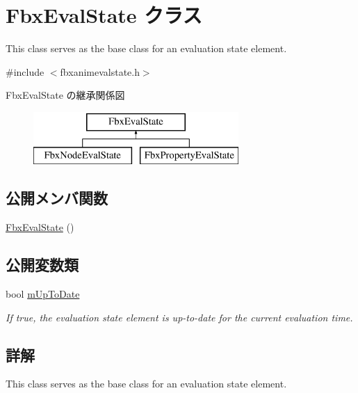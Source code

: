 \hypertarget{class_fbx_eval_state}{}\section{Fbx\+Eval\+State クラス}
\label{class_fbx_eval_state}


This class serves as the base class for an evaluation state element.  




{\ttfamily \#include $<$fbxanimevalstate.\+h$>$}

Fbx\+Eval\+State の継承関係図\begin{figure}[H]
\begin{center}
\leavevmode
\includegraphics[height=2.000000cm]{class_fbx_eval_state}
\end{center}
\end{figure}
\subsection*{公開メンバ関数}
\begin{DoxyCompactItemize}
\item 
\hyperlink{class_fbx_eval_state_a9c54619a6fa810228fbb017965492507}{Fbx\+Eval\+State} ()
\end{DoxyCompactItemize}
\subsection*{公開変数類}
\begin{DoxyCompactItemize}
\item 
bool \hyperlink{class_fbx_eval_state_a9c153054cba876e54d38046e582b32d0}{m\+Up\+To\+Date}
\begin{DoxyCompactList}\small\item\em If {\ttfamily true}, the evaluation state element is up-\/to-\/date for the current evaluation time. \end{DoxyCompactList}\end{DoxyCompactItemize}


\subsection{詳解}
This class serves as the base class for an evaluation state element. 

